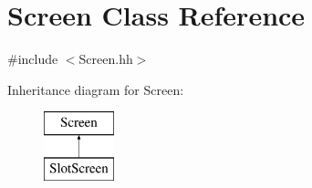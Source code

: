 \hypertarget{classScreen}{\section{Screen Class Reference}
\label{classScreen}
}


{\ttfamily \#include $<$Screen.\-hh$>$}

Inheritance diagram for Screen\-:\begin{figure}[H]
\begin{center}
\leavevmode
\includegraphics[height=2.000000cm]{classScreen}
\end{center}
\end{figure}
